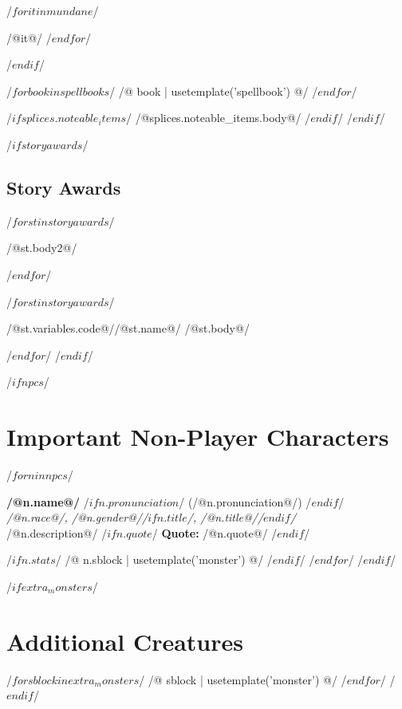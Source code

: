 \documentclass[10pt,twocolumn,twoside,openany]{book}
\begin{document}
\begin{dnditemize}
/$ for it in mundane $/
\item /@it@/
/$ endfor $/
\end{dnditemize}
/$endif $/

/$for book in spellbooks $/
/@ book | usetemplate('spellbook') @/
/$endfor$/

/$ if splices.noteable_items $/
/@splices.noteable_items.body@/
/$ endif $/
/$ endif $/

/$ if storyawards $/
\section*{Story Awards}

/$ for st in storyawards $/
\par /@st.body2@/
\vspace{10pt}

/$ endfor $/

/$ for st in storyawards $/
\label{/@st.label@/}
\begin{storyaward}{/@st.variables.code@/}{/@st.name@/}
/@st.body@/
\end{storyaward}
\vspace{15pt}
/$ endfor $/
/$ endif $/
\vfill

/$ if npcs $/
\chapter{Important Non-Player Characters}
\label{appendix_important_nonplayer_characters}

/$ for n in npcs $/
\par\noindent\label{npc_/@n.label@/}\textbf{/@n.name@/} /$if n.pronunciation$/ (/@n.pronunciation@/) /$endif$/\\
\textit{/@n.race@/, /@n.gender@//$if n.title$/, /@n.title@//$endif$/}\\
/@n.description@/
/$if n.quote $/
\textbf{Quote:} /@n.quote@/
/$endif$/

/$ if n.stats $/
/@ n.sblock | usetemplate('monster') @/
/$ endif $/
\vspace*{3mm}
/$ endfor $/
/$ endif $/

/$ if extra_monsters $/
\chapter{Additional Creatures}
\label{appendix_additional_creatures}
/$ for sblock in extra_monsters $/
/@ sblock | usetemplate('monster') @/
/$ endfor $/
/$endif$/
\end{document}
